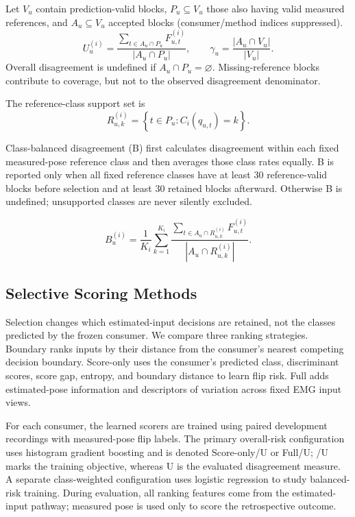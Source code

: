 \documentclass[conference,letterpaper]{IEEEtran}
\begin{document}
Let \(V_u\) contain prediction-valid blocks, \(P_u\subseteq V_u\) those also having valid measured references, and \(A_u\subseteq V_u\) accepted blocks (consumer/method indices suppressed).
\begin{equation}\label{eq:overall}
U_u^{(i)}=\frac{\sum_{t\in A_u\cap P_u}F_{u,t}^{(i)}}{|A_u\cap P_u|},
\qquad
\gamma_u=\frac{|A_u\cap V_u|}{|V_u|}.
\end{equation}
Overall disagreement is undefined if \(A_u\cap P_u=\varnothing\). Missing-reference blocks contribute to coverage, but not to the observed disagreement denominator.

The reference-class support set is
\begin{equation}\label{eq:reference-support}
R_{u,k}^{(i)}=\left\{t\in P_u:C_i(q_{u,t})=k\right\}.
\end{equation}

Class-balanced disagreement (B) first calculates disagreement within each fixed measured-pose reference class and then averages those class rates equally. B is reported only when all fixed reference classes have at least 30 reference-valid blocks before selection and at least 30 retained blocks afterward. Otherwise B is undefined; unsupported classes are never silently excluded.

\begin{equation}\label{eq:balanced}
B_u^{(i)}=\frac{1}{K_i}\sum_{k=1}^{K_i}
\frac{\sum_{t\in A_u\cap R_{u,k}^{(i)}}F_{u,t}^{(i)}}
{|A_u\cap R_{u,k}^{(i)}|}.
\end{equation}

\subsection{Selective Scoring Methods}\label{selective-scoring-methods}
Selection changes which estimated-input decisions are retained, not the classes predicted by the frozen consumer. We compare three ranking strategies. Boundary ranks inputs by their distance from the consumer's nearest competing decision boundary. Score-only uses the consumer's predicted class, discriminant scores, score gap, entropy, and boundary distance to learn flip risk. Full adds estimated-pose information and descriptors of variation across fixed EMG input views.

For each consumer, the learned scorers are trained using paired development recordings with measured-pose flip labels. The primary overall-risk configuration uses histogram gradient boosting and is denoted Score-only/U or Full/U; /U marks the training objective, whereas U is the evaluated disagreement measure. A separate class-weighted configuration uses logistic regression to study balanced-risk training. During evaluation, all ranking features come from the estimated-input pathway; measured pose is used only to score the retrospective outcome.
\end{document}

